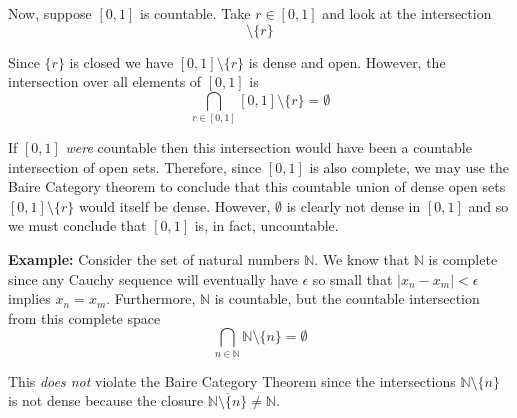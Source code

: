 \documentclass[12pt]{article}
\newlength\tindent
\renewcommand{\indent}{\hspace*{\tindent}}
\newcommand{\N}{\mathbb N}
\begin{document}
Now, suppose $[0,1]$ is countable. Take $r \in [0,1]$ and look at the intersection
\begin{equation*}
	[0,1]\setminus\{r\}
\end{equation*}

\indent Since $\{r\}$ is closed we have $[0,1]\setminus\{r\}$ is dense and open. However, the intersection over all elements of $[0,1]$ is
\begin{equation*}
	\bigcap_{r\in[0,1]} [0,1]\setminus\{r\} = \emptyset
\end{equation*}

\indent If $[0,1]$ {\em were} countable then this intersection would have been a countable intersection of open sets. Therefore, since $[0,1]$ is also complete, we may use the Baire Category theorem to conclude that this countable union of dense open sets $[0,1]\setminus\{r\}$ would itself be dense. However, $\emptyset$ is clearly not dense in $[0,1]$ and so we must conclude that $[0,1]$ is, in fact, uncountable.

%
%
{\bf Example:} Consider the set of natural numbers $\N$. We know that $\N$ is complete since any Cauchy sequence will eventually have $\epsilon$ so small that $|x_n - x_m| < \epsilon$ implies $x_n = x_m$. Furthermore, $\N$ is countable, but the countable intersection from this complete space
\begin{equation*}
	\bigcap_{n\in\N} \N\setminus\{n\} = \emptyset
\end{equation*}

\indent This {\em does not} violate the Baire Category Theorem since the intersections $\N\setminus\{n\}$ is not dense because the closure $\overline{\N\setminus\{n\}} \neq \N$.
\end{document}
